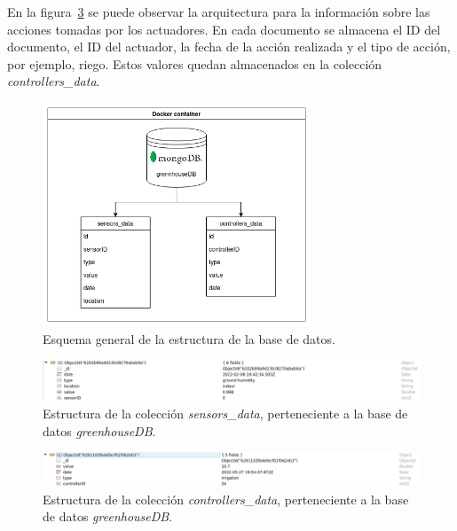 \documentclass[a4paper, 12pt, oneside]{book}
\begin{document}
En la figura~\ref{figura:controllers data collection} se puede observar la arquitectura para la información sobre las acciones tomadas por los actuadores. En cada documento se almacena el ID del documento, el ID del actuador, la fecha de la acción realizada y el tipo de acción, por ejemplo, riego. Estos valores quedan almacenados en la colección \textit{controllers\_data}.

\begin{figure}[H]
	\centering
    \includegraphics[width=8cm, keepaspectratio]{img/estructura_db}
    \caption{Esquema general de la estructura de la base de datos.}
    \label{figura:estructura_bd}
\end{figure}
\begin{figure}[H]
	\centering
    \includegraphics[width=15cm, keepaspectratio]{img/sensors_data_collection}
    \caption{Estructura de la colección \textit{sensors\_data}, perteneciente a la base de datos \textit{greenhouseDB}.}
    \label{figura:sensors data collection}
\end{figure}
\begin{figure}[H]
	\centering
    \includegraphics[width=15cm, keepaspectratio]{img/controllers_data_collection}
    \caption{Estructura de la colección \textit{controllers\_data}, perteneciente a la base de datos \textit{greenhouseDB}.}
    \label{figura:controllers data collection}
\end{figure}
\end{document}
